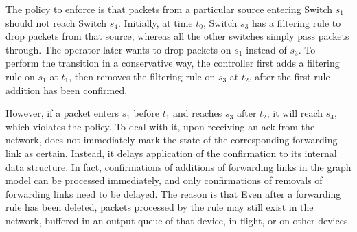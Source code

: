 
The policy to enforce is that packets from a particular source entering Switch $s_1$ should not reach Switch $s_4$.
Initially, at time $t_0$, Switch $s_3$ has a filtering rule to drop packets from that source, 
whereas all the other switches simply pass packets through.
The operator later wants
to drop packets on $s_1$ instead of $s_3$.
To perform the transition in a conservative way, the controller first adds a filtering rule on $s_1$ at $t_1$, then removes the filtering rule on $s_3$ at $t_2$, after the first rule addition has been confirmed.

However, if a packet enters $s_1$ before $t_1$ and reaches $s_3$ after $t_2$, 
it will reach $s_4$, which violates the policy.
To deal with it, upon receiving an ack from the network, \name does not immediately mark the state of the corresponding 
forwarding link as certain.
Instead, it delays application of the confirmation to its internal data structure. 
In fact, confirmations of additions of forwarding links in the graph model can be processed immediately, and only confirmations of removals of forwarding links
need to be delayed. 
The reason is that  
Even after a forwarding rule has been deleted, packets processed by the rule may still exist in the network, buffered in an output queue of that device, in flight, or on other devices. %

